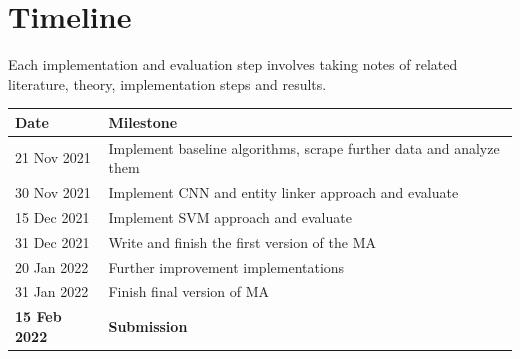 \documentclass[a4paper]{article}
\begin{document}
\section{Timeline}
Each implementation and evaluation step involves taking notes of related literature, theory, implementation steps and results. 
\begin{table}[hb!]
  \begin{tabular}{ll}
  \hline
  \textbf{Date}        & \textbf{Milestone}                                                  \\ \hline
  21 Nov 2021          & Implement baseline algorithms, scrape further data and analyze them \\
  30 Nov 2021          & Implement CNN and entity linker approach and evaluate               \\
  15 Dec 2021          & Implement SVM approach and evaluate                                 \\
  31 Dec 2021          & Write and finish the first version of the MA                        \\
  20 Jan 2022          & Further improvement implementations                                 \\
  31 Jan 2022          & Finish final version of MA                                          \\ \hline
  \textbf{15 Feb 2022} & \textbf{Submission}                                                
  \end{tabular}
  \end{table}

\clearpage



    
\end{document}
